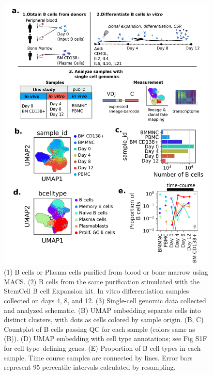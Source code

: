 \begin{figure}[hbt!]
\centering
\includegraphics[width=14cm, keepaspectratio]{figs/paper2/fig1_bcd.png}
\caption[Experimental overview for studying in vitro B cell dynamics using integrated single-cell genomics and lineage tracing.]{(1) B cells or Plasma cells purified from blood or bone marrow using MACS. (2) B cells from the same purification stimulated with the StemCell B cell Expansion kit. In vitro differentiation samples collected on days 4, 8, and 12. (3) Single-cell genomic data collected and analyzed schematic. (B) UMAP embedding separate cells into distinct clusters, with dots as cells colored by sample origin. (B, C) Countplot of B cells passing QC for each sample (colors same as (B)). (D) UMAP embedding with cell type annotations; see Fig S1F for cell type–defining genes. (E) Proportion of B cell types in each sample. Time course samples are connected by lines. Error bars represent 95 percentile intervals calculated by resampling.}
\label{fig:paper2_fig_1}
\end{figure}